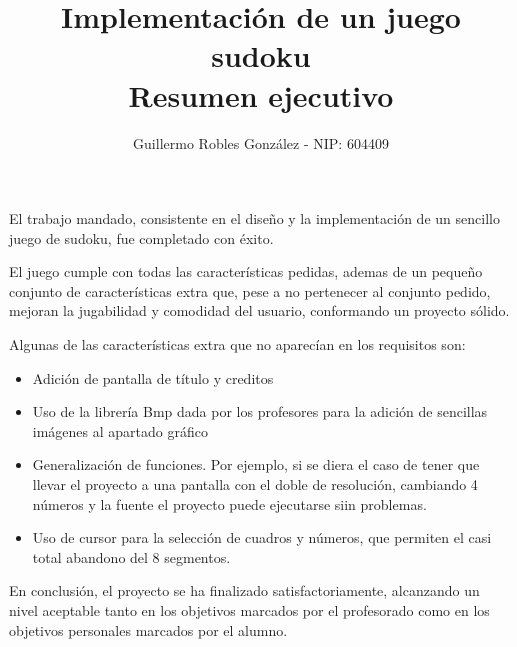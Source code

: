 \documentclass[12pt,letterpaper]{article}
\title{Implementación de un juego sudoku\\\vspace{1cm}Resumen ejecutivo}
\author{Guillermo Robles González - NIP: 604409}
\begin{document}
\maketitle

El trabajo mandado, consistente en el diseño y la implementación de un
sencillo juego de sudoku, fue completado con éxito.

El juego cumple con todas las características pedidas, ademas de un
pequeño conjunto de características extra que, pese a no pertenecer al
conjunto pedido, mejoran la jugabilidad y comodidad del usuario,
conformando un proyecto sólido.

Algunas de las características extra que no aparecían en los
requisitos son:
\begin{itemize}
  \item Adición de pantalla de título y creditos
  \item Uso de la librería Bmp dada por los profesores para la adición
    de sencillas imágenes al apartado gráfico
  \item Generalización de funciones. Por ejemplo, si se diera el caso
    de tener que llevar el proyecto a una pantalla con el doble de
    resolución, cambiando 4 números y la fuente el proyecto puede
    ejecutarse siin problemas.
  \item Uso de cursor para la selección de cuadros y números, que
    permiten el casi total abandono del 8 segmentos.
\end{itemize}

En conclusión, el proyecto se ha finalizado satisfactoriamente,
alcanzando un nivel aceptable tanto en los objetivos marcados por el
profesorado como en los objetivos personales marcados por el alumno.
\end{document}
